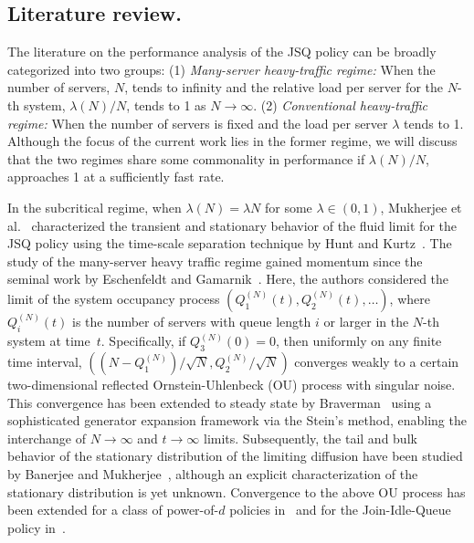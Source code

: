 \documentclass[11pt, reqno]{article}
\numberwithin{equation}{section}
\numberwithin{theorem}{section}
\begin{document}
\subsection{Literature review.}\label{ssec:lit-rev}
The literature on the performance analysis of the JSQ policy can be broadly categorized into two groups: 
(1) \emph{Many-server heavy-traffic regime:} When the number of servers, $N$, tends to infinity and the relative load per server for the $N$-th system, $\lambda(N)/N$, tends to 1 as $N\to\infty$. 
(2) \emph{Conventional heavy-traffic regime:} When the number of servers is fixed and the load per server $\lambda$ tends to 1.
Although the focus of the current work lies in the former regime, we will discuss that the two regimes share some commonality in performance if $\lambda(N)/N$, approaches 1 at a sufficiently fast rate.

In the subcritical regime, when $\lambda(N) = \lambda N$ for some $\lambda\in (0,1)$, Mukherjee et al.~\cite{MBLW16-3} characterized the transient and stationary behavior of the fluid limit for the JSQ policy using the time-scale separation technique by Hunt and Kurtz~\cite{HK94}.
The study of the many-server heavy traffic regime gained momentum since the seminal work by Eschenfeldt and Gamarnik~\cite{EG15}.
Here, the authors considered the limit of the system occupancy process $(Q_1^{(N)}(t), Q_2^{(N)}(t),\ldots)$, where $Q_i^{(N)}(t)$ is the number of servers with queue length $i$ or larger in the $N$-th system at time~$t$. 
Specifically, if $Q_3^{(N)}(0) = 0$, then uniformly on any finite time interval, $((N-Q_1^{(N)})/\sqrt{N}, Q_2^{(N)}/\sqrt{N})$ converges weakly to a certain two-dimensional reflected Ornstein-Uhlenbeck (OU) process with singular noise.
This convergence has been extended to steady state by Braverman~\cite{Braverman18} using a sophisticated generator expansion framework via the Stein's method, enabling the interchange of $N\to\infty$ and $t\to\infty$ limits.
Subsequently, the tail and bulk behavior of the stationary distribution of the limiting diffusion have been studied by Banerjee and Mukherjee~\cite{BM19a, BM19b}, although an explicit characterization of the stationary distribution is yet unknown.
Convergence to the above OU process has been extended for a class of power-of-$d$ policies in~\cite{MBLW16-3} and for the Join-Idle-Queue policy in~\cite{MBLW16-1}.
\end{document}
